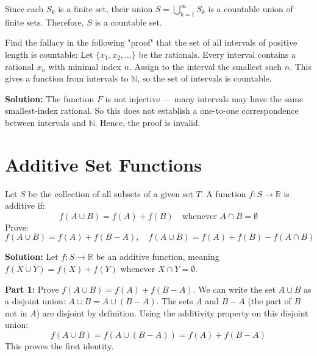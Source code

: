 Since each $S_k$ is a finite set, their union $S = \bigcup_{k=1}^{\infty} S_k$ is a countable union of finite sets. Therefore, $S$ is a countable set.

\begin{problembox}
Find the fallacy in the following "proof" that the set of all intervals of positive length is countable:  
Let \( \{x_1, x_2, \ldots\} \) be the rationals. Every interval contains a rational \( x_n \) with minimal index \( n \).  
Assign to the interval the smallest such \( n \). This gives a function from intervals to \( \mathbb{N} \), so the set of intervals is countable.
\end{problembox}

\textbf{Solution:}  
The function \( F \) is not injective — many intervals may have the same smallest-index rational.  
So this does not establish a one-to-one correspondence between intervals and \( \mathbb{N} \).  
Hence, the proof is invalid.

\section{Additive Set Functions}
\begin{problembox}
Let \( S \) be the collection of all subsets of a given set \( T \).  
A function \( f: S \to \mathbb{R} \) is additive if:
\[
f(A \cup B) = f(A) + f(B)
\quad \text{whenever } A \cap B = \emptyset
\]  
Prove:  
\[
f(A \cup B) = f(A) + f(B - A), \quad 
f(A \cup B) = f(A) + f(B) - f(A \cap B)
\]
\end{problembox}

\textbf{Solution:}  
Let $f: S \to \mathbb{R}$ be an additive function, meaning $f(X \cup Y) = f(X) + f(Y)$ whenever $X \cap Y = \emptyset$.

\textbf{Part 1:} Prove $f(A \cup B) = f(A) + f(B - A)$.
We can write the set $A \cup B$ as a disjoint union: $A \cup B = A \cup (B - A)$. The sets $A$ and $B-A$ (the part of $B$ not in $A$) are disjoint by definition.
Using the additivity property on this disjoint union:
\[ f(A \cup B) = f(A \cup (B-A)) = f(A) + f(B-A) \]
This proves the first identity.

